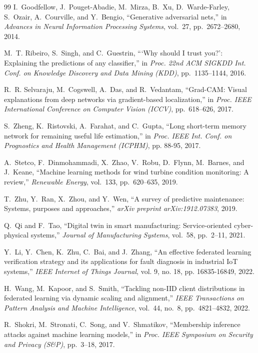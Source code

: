 \documentclass[journal,10pt,compsoc]{IEEEtran}
\begin{document}
\begin{thebibliography}{99}
I.~Goodfellow, J.~Pouget-Abadie, M.~Mirza, B.~Xu, D.~Warde-Farley, S.~Ozair, A.~Courville, and Y.~Bengio, ``Generative adversarial nets,'' in \emph{Advances in Neural Information Processing Systems}, vol.~27, pp.~2672--2680, 2014.

M.~T. Ribeiro, S.~Singh, and C.~Guestrin, ```Why should I trust you?': Explaining the predictions of any classifier,'' in \emph{Proc. 22nd ACM SIGKDD Int. Conf. on Knowledge Discovery and Data Mining (KDD)}, pp.~1135--1144, 2016.

R.~R. Selvaraju, M.~Cogswell, A.~Das, and R.~Vedantam, ``Grad-CAM: Visual explanations from deep networks via gradient-based localization,'' in \emph{Proc. IEEE International Conference on Computer Vision (ICCV)}, pp.~618--626, 2017.

S.~Zheng, K.~Ristovski, A.~Farahat, and C.~Gupta, ``Long short-term memory network for remaining useful life estimation,'' in \emph{Proc. IEEE Int. Conf. on Prognostics and Health Management (ICPHM)}, pp. 88-95, 2017.

A.~Stetco, F.~Dinmohammadi, X.~Zhao, V.~Robu, D.~Flynn, M.~Barnes, and J.~Keane, ``Machine learning methods for wind turbine condition monitoring: A review,'' \emph{Renewable Energy}, vol.~133, pp.~620--635, 2019.

T.~Zhu, Y.~Ran, X.~Zhou, and Y.~Wen, ``A survey of predictive maintenance: Systems, purposes and approaches,'' \emph{arXiv preprint arXiv:1912.07383}, 2019.

Q.~Qi and F.~Tao, ``Digital twin in smart manufacturing: Service-oriented cyber-physical systems,'' \emph{Journal of Manufacturing Systems}, vol.~58, pp.~2--11, 2021.

Y.~Li, Y.~Chen, K.~Zhu, C.~Bai, and J.~Zhang, ``An effective federated learning verification strategy and its applications for fault diagnosis in industrial IoT systems,'' \emph{IEEE Internet of Things Journal}, vol. 9, no. 18, pp. 16835-16849, 2022.

H.~Wang, M.~Kapoor, and S.~Smith, ``Tackling non-IID client distributions in federated learning via dynamic scaling and alignment,'' \emph{IEEE Transactions on Pattern Analysis and Machine Intelligence}, vol.~44, no.~8, pp.~4821--4832, 2022.

R.~Shokri, M.~Stronati, C.~Song, and V.~Shmatikov, ``Membership inference attacks against machine learning models,'' in \emph{Proc. IEEE Symposium on Security and Privacy (S\&P)}, pp.~3--18, 2017.


\end{thebibliography}
\end{document}
